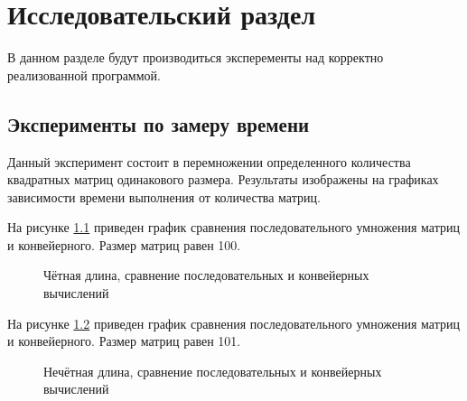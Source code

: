 \chapter{Исследовательский раздел}
\label{cha:research}

В данном разделе будут производиться эксперементы над корректно реализованной программой.

\section{Эксперименты по замеру времени}

Данный эксперимент состоит в перемножении определенного количества квадратных матриц одинакового размера. Результаты изображены на графиках зависимости времени выполнения от количества матриц.

На рисунке \ref{img:even} приведен график сравнения последовательного умножения матриц и конвейерного. Размер матриц равен 100.

\begin{figure}[H]
    \centering
    \caption{Чётная длина, сравнение последовательных и конвейерных вычислений}
    \label{img:even}
\end{figure}

На рисунке \ref{img:uneven} приведен график сравнения последовательного умножения матриц и конвейерного. Размер матриц равен 101.

\begin{figure}[H]
    \centering
    \caption{Нечётная длина, сравнение последовательных и конвейерных вычислений}
    \label{img:uneven}
\end{figure}

